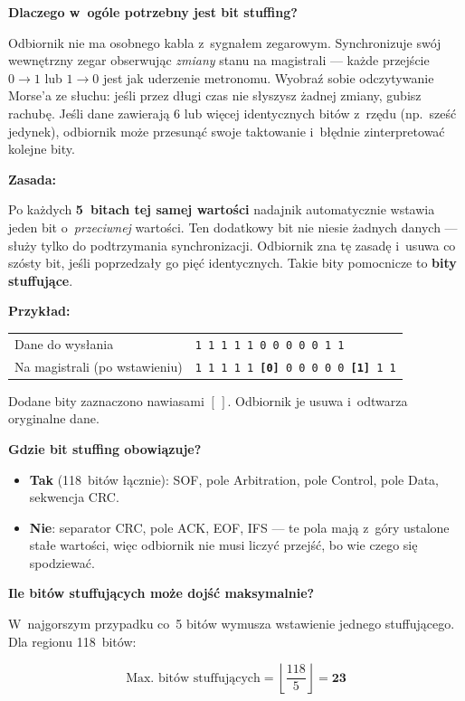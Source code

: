 \documentclass[12pt,a4paper]{article}
\begin{document}
\textbf{Dlaczego w~ogóle potrzebny jest bit stuffing?}

Odbiornik nie ma osobnego kabla z~sygnałem zegarowym. Synchronizuje swój
wewnętrzny zegar obserwując \emph{zmiany} stanu na magistrali — każde
przejście $0\to1$ lub $1\to0$ jest jak uderzenie metronomu. Wyobraź sobie
odczytywanie Morse'a ze słuchu: jeśli przez długi czas nie słyszysz żadnej
zmiany, gubisz rachubę. Jeśli dane zawierają 6 lub więcej identycznych bitów
z~rzędu (np.\ sześć jedynek), odbiornik może przesunąć swoje taktowanie
i~błędnie zinterpretować kolejne bity.

\textbf{Zasada:}

Po każdych \textbf{5~bitach tej samej wartości} nadajnik automatycznie
wstawia jeden bit o~\emph{przeciwnej} wartości. Ten dodatkowy bit nie niesie
żadnych danych — służy tylko do podtrzymania synchronizacji. Odbiornik zna
tę zasadę i~usuwa co szósty bit, jeśli poprzedzały go pięć identycznych.
Takie bity pomocnicze to \textbf{bity stuffujące}.

\textbf{Przykład:}
\begin{center}
\begin{tabular}{ll}
\toprule
Dane do wysłania & \texttt{1 1 1 1 1 0 0 0 0 0 1 1} \\
Na magistrali (po wstawieniu) & \texttt{1 1 1 1 1 \textbf{[0]} 0 0 0 0 0 \textbf{[1]} 1 1} \\
\bottomrule
\end{tabular}
\end{center}
Dodane bity zaznaczono nawiasami $[\,]$. Odbiornik je usuwa i~odtwarza
oryginalne dane.

\textbf{Gdzie bit stuffing obowiązuje?}
\begin{itemize}
    \item \textbf{Tak} (118~bitów łącznie): SOF, pole Arbitration, pole
          Control, pole Data, sekwencja CRC.
    \item \textbf{Nie}: separator CRC, pole ACK, EOF, IFS — te pola mają
          z~góry ustalone stałe wartości, więc odbiornik nie musi liczyć
          przejść, bo wie czego się spodziewać.
\end{itemize}

\textbf{Ile bitów stuffujących może dojść maksymalnie?}

W~najgorszym przypadku co~5 bitów wymusza wstawienie jednego stuffującego.
Dla regionu 118~bitów:

\begin{equation}
\text{Max.\ bitów stuffujących} = \left\lfloor \frac{118}{5} \right\rfloor = \mathbf{23}
\end{equation}
\end{document}
